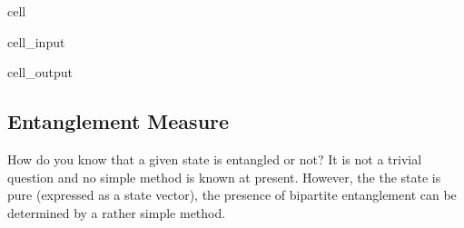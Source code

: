 \documentclass[letterpaper,10pt,english]{jupyterBook}
\begin{document}
\begin{sphinxuseclass}{cell}\begin{sphinxVerbatimInput}

\begin{sphinxuseclass}{cell_input}
\begin{sphinxVerbatim}[commandchars=\\\{\}]
  


  

  

  

   
\end{sphinxVerbatim}

\end{sphinxuseclass}\end{sphinxVerbatimInput}
\begin{sphinxVerbatimOutput}

\begin{sphinxuseclass}{cell_output}
\noindent{}

\end{sphinxuseclass}\end{sphinxVerbatimOutput}

\end{sphinxuseclass}

\subsection{Entanglement Measure}
\label{\detokenize{composites/2qubit:entanglement-measure}}
\sphinxAtStartPar
How do you know that a given state is entangled or not?  It is not a trivial question and  no simple method is known at present.  However, the the state  is pure (expressed as a state vector),  the presence of bipartite entanglement can be determined by a rather simple method.
\end{document}
